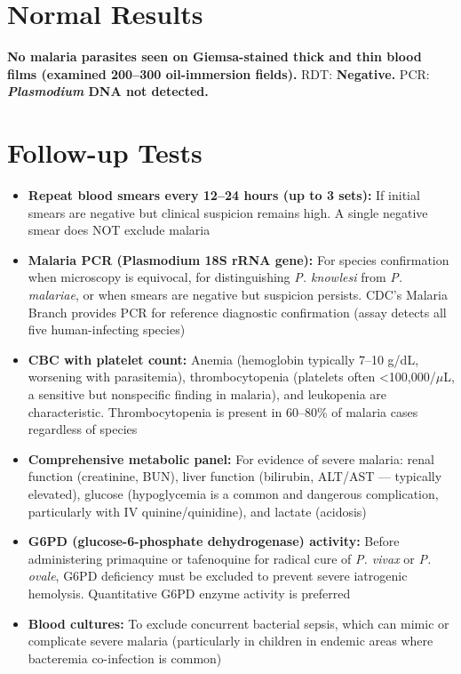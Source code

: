 \section*{Normal Results}
\textbf{No malaria parasites seen on Giemsa-stained thick and thin blood films (examined 200--300 oil-immersion fields).} RDT: \textbf{Negative.} PCR: \textbf{\textit{Plasmodium} DNA not detected.}

\section*{Follow-up Tests}
\begin{itemize}
  \item \textbf{Repeat blood smears every 12--24 hours (up to 3 sets):} If initial smears are negative but clinical suspicion remains high. A single negative smear does NOT exclude malaria
  \item \textbf{Malaria PCR (Plasmodium 18S rRNA gene):} For species confirmation when microscopy is equivocal, for distinguishing \textit{P. knowlesi} from \textit{P. malariae}, or when smears are negative but suspicion persists. CDC's Malaria Branch provides PCR for reference diagnostic confirmation (assay detects all five human-infecting species)
  \item \textbf{CBC with platelet count:} Anemia (hemoglobin typically 7--10 g/dL, worsening with parasitemia), thrombocytopenia (platelets often <100,000/$\mu$L, a sensitive but nonspecific finding in malaria), and leukopenia are characteristic. Thrombocytopenia is present in 60--80\% of malaria cases regardless of species
  \item \textbf{Comprehensive metabolic panel:} For evidence of severe malaria: renal function (creatinine, BUN), liver function (bilirubin, ALT/AST --- typically elevated), glucose (hypoglycemia is a common and dangerous complication, particularly with IV quinine/quinidine), and lactate (acidosis)
  \item \textbf{G6PD (glucose-6-phosphate dehydrogenase) activity:} Before administering primaquine or tafenoquine for radical cure of \textit{P. vivax} or \textit{P. ovale}, G6PD deficiency must be excluded to prevent severe iatrogenic hemolysis. Quantitative G6PD enzyme activity is preferred
  \item \textbf{Blood cultures:} To exclude concurrent bacterial sepsis, which can mimic or complicate severe malaria (particularly in children in endemic areas where bacteremia co-infection is common)
\end{itemize}

